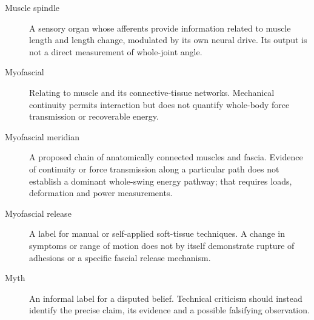 \begin{description}
\item[Muscle spindle] A sensory organ whose afferents provide information related to muscle length and length change, modulated by its own neural drive. Its output is not a direct measurement of whole-joint angle.

\item[Myofascial] Relating to muscle and its connective-tissue networks. Mechanical continuity permits interaction but does not quantify whole-body force transmission or recoverable energy.

\item[Myofascial meridian] A proposed chain of anatomically connected muscles and fascia. Evidence of continuity or force transmission along a particular path does not establish a dominant whole-swing energy pathway; that requires loads, deformation and power measurements.

\item[Myofascial release] A label for manual or self-applied soft-tissue techniques. A change in symptoms or range of motion does not by itself demonstrate rupture of adhesions or a specific fascial release mechanism.

\item[Myth] An informal label for a disputed belief. Technical criticism should instead identify the precise claim, its evidence and a possible falsifying observation.

\end{description}
